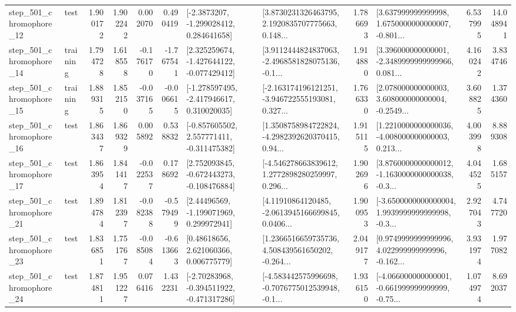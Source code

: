 \begin{tabular}{llrrrrllrlrr}
  step\_501\_chromophore\_12 &      test &      1.900172 &    1.902242 &      0.002070 &  0.490419 &     [-2.3873207, -1.299028412, 0.284641658] &  [3.8730231326463795, 2.1920835707775663, 0.148... &       1.786693 &  [3.637999999999998, 1.6750000000000007, -0.801... &            6.537995 &         14.048941 \\
  step\_501\_chromophore\_14 &  training &      1.794728 &    1.618558 &     -0.176170 & -1.767541 &   [2.325259674, -1.427644122, -0.077429412] &  [3.9112444824837063, -2.4968581828075136, -0.1... &       1.914880 &  [3.396000000000001, -2.3489999999999966, 0.081... &            4.160242 &          3.834746 \\
  step\_501\_chromophore\_15 &  training &      1.889315 &    1.852150 &     -0.037165 & -0.006615 &   [-1.278597495, -2.417946617, 0.310020035] &  [-2.163174196121251, -3.946722555193081, 0.327... &       1.766330 &  [2.078000000000003, 3.608000000000004, -0.2549... &            3.608825 &          1.374360 \\
  step\_501\_chromophore\_16 &      test &      1.863437 &    1.869329 &      0.005892 &  0.538832 &   [-0.857605502, 2.557771411, -0.311475382] &  [1.3508758984722824, -4.2982392620370415, 0.94... &       1.915115 &  [1.2210000000000036, -4.008000000000003, 0.213... &            4.003998 &          8.889308 \\
  step\_501\_chromophore\_17 &      test &      1.863954 &    1.841417 &     -0.022537 &  0.178692 &   [2.752093845, -0.672443273, -0.108476884] &  [-4.546278663839612, 1.2772898280259997, 0.296... &       1.902696 &  [3.8760000000000012, -1.1630000000000038, -0.3... &            4.044525 &          1.685157 \\
  step\_501\_chromophore\_21 &      test &      1.894784 &    1.812397 &     -0.082388 & -0.579499 &     [2.44496569, -1.199071969, 0.299972941] &  [4.11910864120485, -2.0613945166699845, 0.0406... &       1.900953 &  [-3.6500000000000004, 1.9939999999999998, -0.3... &            2.927043 &          4.747720 \\
  step\_501\_chromophore\_23 &      test &      1.836851 &    1.751767 &     -0.085084 & -0.613663 &      [0.48618656, 2.621060366, 0.006775779] &  [1.2366516659735736, 4.508439561650202, -0.264... &       2.049177 &  [0.9749999999999996, 4.022999999999996, -0.162... &            3.931974 &          1.977082 \\
  step\_501\_chromophore\_24 &      test &      1.874811 &    1.951227 &      0.076416 &  1.432231 &   [-2.70283968, -0.394511922, -0.471317286] &  [-4.583442575996698, -0.7076775012539948, -0.1... &       1.936150 &  [-4.066000000000001, -0.661999999999999, -0.75... &            1.074974 &          8.692037 \\

\end{tabular}

